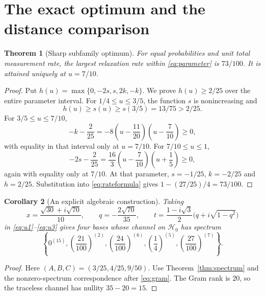 \documentclass[11pt,a4paper]{article}
\newtheorem{theorem}{Theorem}[section]
\newtheorem{corollary}[theorem]{Corollary}
\theoremstyle{remark}
\newcommand{\HH}{\mathcal H_0}
\begin{document}
\section{The exact optimum and the distance comparison}
\begin{theorem}[Sharp subfamily optimum]\label{thm:optimum}
For equal probabilities and unit total measurement rate, the largest relaxation rate within \eqref{eq:parameter} is $73/100$. It is attained uniquely at $u=7/10$.
\end{theorem}
\begin{proof}
Put $h(u)=\max\{0,-2s,s,2k,-k\}$. We prove $h(u)\ge2/25$ over the entire parameter interval. For $1/4\le u\le3/5$, the function $s$ is nonincreasing and
\[
 h(u)\ge s(u)\ge s(3/5)=13/75>2/25.
\]
For $3/5\le u\le7/10$,
\[
 -k-\frac2{25}=-8\left(u-\frac{11}{20}\right)
                         \left(u-\frac7{10}\right)\ge0,
\]
with equality in that interval only at $u=7/10$. For $7/10\le u\le1$,
\[
 -2s-\frac2{25}=\frac{16}{3}\left(u-\frac7{10}\right)
                                     \left(u+\frac15\right)\ge0,
\]
again with equality only at $7/10$. At that parameter, $s=-1/25$, $k=-2/25$ and $h=2/25$. Substitution into \eqref{eq:rateformula} gives $1-(27/25)/4=73/100$.
\end{proof}

\begin{corollary}[An explicit algebraic construction]\label{cor:construction}
Taking
\[
 x=\frac{\sqrt{30}+i\sqrt{70}}{10},\qquad
 q=-\frac{2\sqrt{70}}{35},\qquad
 t=\frac{1-i\sqrt3}{2}\bigl(q+i\sqrt{1-q^2}\bigr)
\]
in \eqref{eq:u1}--\eqref{eq:u3} gives four bases whose channel on $\HH$ has spectrum
\begin{equation}\label{eq:optspectrum}
 \left\{0^{(15)},\left(\frac{21}{100}\right)^{(2)},
 \left(\frac{24}{100}\right)^{(6)},
 \left(\frac14\right)^{(5)},
 \left(\frac{27}{100}\right)^{(7)}\right\}.
\end{equation}
\end{corollary}
\begin{proof}
Here $(A,B,C)=(3/25,4/25,9/50)$. Use Theorem~\ref{thm:spectrum} and the nonzero-spectrum correspondence after \eqref{eq:gram}. The Gram rank is $20$, so the traceless channel has nullity $35-20=15$.
\end{proof}
\end{document}
